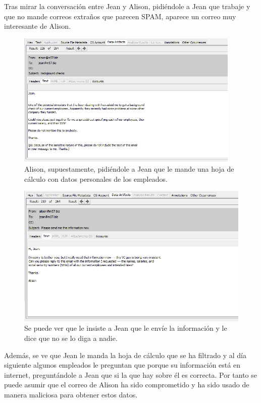 \documentclass{article}
\begin{document}
Tras mirar la conversación entre Jean y Alison, pidiéndole a Jean que trabaje y que no mande correos extraños que parecen SPAM, aparece un correo muy interesante de Alison.

\begin{figure}[H]
    \centering
    \includegraphics[width=0.95\textwidth]{imagenes/Windows/Captura de pantalla (9).png}
    \caption{Alison, supuestamente, pidiéndole a Jean que le mande una hoja de cálculo con datos personales de los empleados.}
\end{figure}

\begin{figure}[H]
    \centering
    \includegraphics[width=\textwidth]{imagenes/Windows/Captura de pantalla (10).png}
    \caption{Se puede ver que le insiste a Jean que le envíe la información y le dice que no se lo diga a nadie.}
\end{figure}

Además, se ve que Jean le manda la hoja de cálculo que se ha filtrado y al día siguiente algunos empleados le preguntan que porque su información está en internet, preguntándole a Jean que si la que hay sobre él es correcta. Por tanto se puede asumir que el correo de Alison ha sido comprometido y ha sido usado de manera maliciosa para obtener estos datos.
\end{document}
